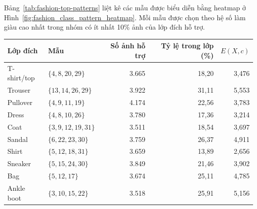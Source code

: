 \documentclass[conference,a4paper]{IEEEtran}
\makeatletter
\newenvironment{reporttable}{\par\medskip\noindent\begin{minipage}{\columnwidth}\def\@captype{table}\centering}{\end{minipage}\par\medskip}
\makeatother
\begin{document}
Bảng~\ref{tab:fashion-top-patterns} liệt kê các mẫu được biểu diễn
bằng heatmap ở Hình~\ref{fig:fashion_class_pattern_heatmap}. Mỗi mẫu
được chọn theo hệ số làm giàu cao nhất trong nhóm có ít nhất 10\%
ảnh của lớp đích hỗ trợ.

\begin{reporttable}
\caption{Mẫu nhiều mã có hệ số làm giàu cao nhất trong từng lớp.}
\label{tab:fashion-top-patterns}
\scriptsize
\setlength{\tabcolsep}{2pt}
\begin{tabular}{@{}l l r r r@{}}\toprule
Lớp đích & Mẫu & Số ảnh hỗ trợ & Tỷ lệ trong lớp (\%) & $E(X,c)$ \\\midrule
T-shirt/top & $\{4,8,20,29\}$ & 3.665 & 18,20 & 3,476 \\
Trouser & $\{13,14,26,29\}$ & 3.922 & 31,11 & 5,553 \\
Pullover & $\{4,9,11,19\}$ & 4.174 & 22,56 & 3,783 \\
Dress & $\{4,8,10,26\}$ & 3.780 & 17,36 & 3,214 \\
Coat & $\{3,9,12,19,31\}$ & 3.511 & 18,54 & 3,697 \\
Sandal & $\{6,22,23,30\}$ & 3.759 & 26,37 & 4,911 \\
Shirt & $\{5,12,18,31\}$ & 3.659 & 13,89 & 2,656 \\
Sneaker & $\{5,15,24,30\}$ & 3.849 & 21,46 & 3,902 \\
Bag & $\{5,12,17\}$ & 3.674 & 25,11 & 4,785 \\
Ankle boot & $\{3,10,15,22\}$ & 3.518 & 25,91 & 5,156 \\\bottomrule
\end{tabular}
\end{reporttable}
\end{document}
